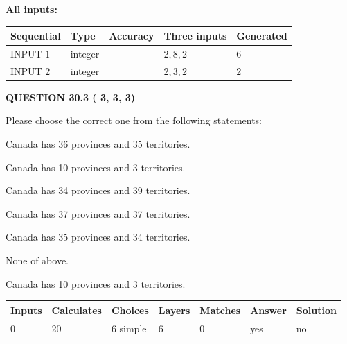 \documentclass[12pt]{article}
\begin{document}
   
   
   
\noindent\vspace{0.1in}\hspace{-0.08in} {\textbf{\Large{All inputs: }}}
   
   
  
  
\noindent\begin{tabular}{|l|l|l|l|l|}
\hline
 Sequential & Type & Accuracy & Three inputs & Generated \\ 
\hline
 
 
  INPUT $           1$ & integer &  & $
 2
 , 
 8
 , 
 2
 $ & $ 6 $ 
 \\  \hline  
 
 
  INPUT $           2$ & integer &  & $
 2
 , 
 3
 , 
 2
 $ & $ 2 $ 
 \\  \hline  
 \end{tabular}
   
   
  
\vspace{0.2in}
  
{\textbf{\Large{QUESTION
30.3 
 (          3,          3,          3)
}}}
  
  
Please choose the correct one from the following statements:
 
 
Canada has  %
36 provinces and  %
35 territories.
 
 
Canada has  %
10 provinces and  %
3 territories.
 
 
Canada has  %
34 provinces and  %
39 territories.
 
 
Canada has  %
37 provinces and  %
37 territories.
 
 
Canada has  %
35 provinces and  %
34 territories.
 
 
 None of above.
 
 
\noindent{}
 
 
Canada has  %
10 provinces and  %
3 territories.
 
 
\noindent{}
 
 
   
   
   
   
\noindent\begin{tabular}{|l|l|l|l|l|l|l|}
 \hline
Inputs & Calculates & Choices & Layers & Matches & Answer & Solution \\ \hline
           0 & 
          20 & 
           6
  simple  
  & 
           6 & 
           0 & 
  yes & 
  no 
  \\ \hline
 \end{tabular}
   
\end{document}
